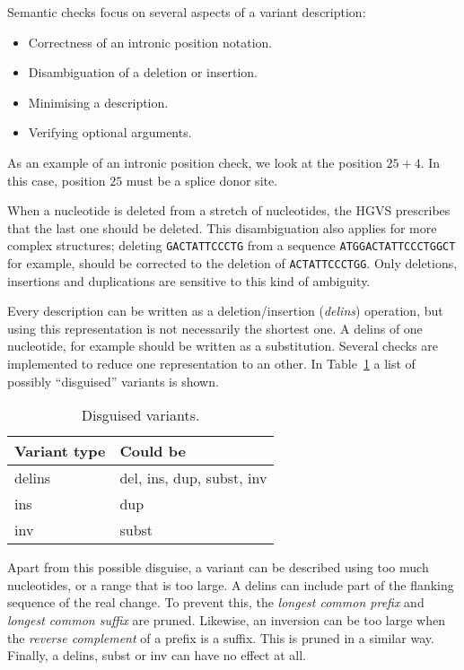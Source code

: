 \documentclass{article}
\begin{document}
Semantic checks focus on several aspects of a variant description:
\begin{itemize}
\item Correctness of an intronic position notation.
\item Disambiguation of a deletion or insertion.
\item Minimising a description.
\item Verifying optional arguments.
\end{itemize}

As an example of an intronic position check, we look at the position $25+4$. In
this case, position $25$ must be a splice donor site.

When a nucleotide is deleted from a stretch of nucleotides, the HGVS prescribes
that the last one should be deleted. This disambiguation also applies for more
complex structures; deleting \verb#GACTATTCCCTG# from a sequence
\verb#ATGGACTATTCCCTGGCT# for example, should be corrected to the deletion of
\verb#ACTATTCCCTGG#. Only deletions, insertions and duplications are sensitive
to this kind of ambiguity.

Every description can be written as a deletion/insertion (\emph{delins})
operation, but using this representation is not necessarily the shortest one. A
delins of one nucleotide, for example should be written as a substitution.
Several checks are implemented to reduce one representation to an other. In 
Table~\ref{tab:erosion} a list of possibly ``disguised'' variants is shown.

\begin{table}[H]
\begin{center}
\begin{tabular}{l|l}
Variant type & Could be \\
\hline
delins & del, ins, dup, subst, inv \\
ins    & dup \\
inv    & subst 
\end{tabular}
\end{center}
\caption{Disguised variants.} \label{tab:erosion}
\end{table}

Apart from this possible disguise, a variant can be described using too much
nucleotides, or a range that is too large. A delins can include part of the
flanking sequence of the real change. To prevent this, the \emph{longest common
prefix} and \emph{longest common suffix} are pruned. Likewise, an inversion 
can be too large when the \emph{reverse complement} of a prefix is a suffix.
This is pruned in a similar way. Finally, a delins, subst or inv can have no
effect at all.
\end{document}

